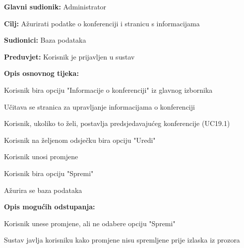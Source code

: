 					\noindent {}
					\begin{packed_item}
						\item \textbf{Glavni sudionik:} Administrator
						\item \textbf{Cilj:} Ažurirati podatke o konferenciji i stranicu s informacijama
						\item \textbf{Sudionici:} Baza podataka
						\item \textbf{Preduvjet:} Korisnik je prijavljen u sustav
						
						\item \textbf{Opis osnovnog tijeka:} 
						\item[] \begin{packed_enum}
							\item Korisnik bira opciju "Informacije o konferenciji" iz glavnog izbornika
							\item Učitava se stranica za upravljanje informacijama o konferenciji
							\item Korisnik, ukoliko to želi, postavlja predsjedavajućeg konferencije (UC19.1)
							\item Korisnik na željenom odsječku bira opciju "Uredi"
							\item Korisnik unosi promjene
							\item Korisnik bira opciju "Spremi"
							\item Ažurira se baza podataka
						\end{packed_enum}
					
						\item \textbf{Opis mogućih odstupanja:}
						\item[] \begin{packed_enum}

							\item[5.a] Korisnik unese promjene, ali ne odabere opciju "Spremi"
							\item[] \begin{packed_enum}
								\item[1.] Sustav javlja korisniku kako promjene nisu spremljene prije izlaska iz prozora
							\end{packed_enum}
							
						\end{packed_enum}
					\end{packed_item}

